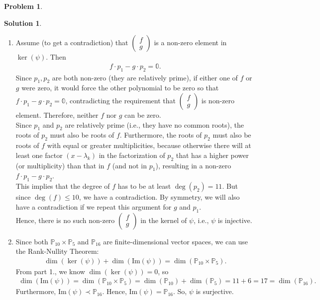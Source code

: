 \documentclass{article}
\theoremstyle{definition}
\newtheorem*{prob*}{Problem}
\newtheorem*{sln*}{Solution}
\newcommand{\ima}{\text{Im}}
\begin{document}
\begin{prob*}
\begin{sln*}
\begin{enumerate}
\begin{enumerate}
		
		
	\end{enumerate}

	
	\item Assume (to get a contradiction) that $\begin{pmatrix}
	f\\g
	\end{pmatrix}$ is a non-zero element in $\ker(\psi)$. Then 
	\begin{align*}
	f\cdot p_1 - g\cdot p_2 = \mathbb{0}.
	\end{align*}
	Since $p_1, p_2$ are both non-zero (they are relatively prime), if either one of $f$ or $g$ were zero, it would force the other polynomial to be zero so that $f\cdot p_1 - g\cdot p_2 = \mathbb{0}$, contradicting the requirement that $\begin{pmatrix}
	f\\g
	\end{pmatrix}$ is non-zero element. Therefore, neither $f$ nor $g$ can be zero. \\
	
	Since $p_1$ and $p_2$ are relatively prime (i.e., they have no common roots), the roots of $p_2$ must also be roots of $f$. Furthermore, the roots of $p_2$ must also be roots of $f$ with equal or greater multiplicities, because otherwise there will at least one factor $(x - \lambda_k)$ in the factorization of $p_2$ that has a higher power (or multiplicity) than that in $f$ (and not in $p_1$), resulting in a non-zero $f\cdot p_1 - g\cdot p_2$.\\
		
	This implies that the degree of $f$ has to be at least $\deg(p_2) = 11$. But since $\deg(f) \leq 10$, we have a contradiction. By symmetry, we will also have a contradiction if we repeat this argument for $g$ and $p_1$.\\
	
	Hence, there is no such non-zero $\begin{pmatrix}
	f\\g
	\end{pmatrix}$ in the kernel of $\psi$, i.e., $\psi$ is injective. \\
	
	
	\item Since both $\mathbb{P}_{10}\times \mathbb{P}_5$ and $\mathbb{P}_{16}$ are finite-dimensional vector spaces, we can use the Rank-Nullity Theorem:
	\begin{align*}
	\dim(\ker(\psi)) + \dim(\ima(\psi)) = \dim(\mathbb{P}_{10} \times \mathbb{P}_{5}).
	\end{align*}
	From part 1., we know $\dim(\ker(\psi)) = 0$, so
	\begin{align*}
	\dim(\ima(\psi)) = \dim(\mathbb{P}_{10} \times \mathbb{P}_{5}) = \dim(\mathbb{P}_{10}) + \dim(\mathbb{P}_5) = 11 + 6 = 17 = \dim(\mathbb{P}_{16}).
	\end{align*}
	Furthermore, $\ima(\psi) \prec \mathbb{P}_{16}$. Hence, $\ima(\psi) = \mathbb{P}_{16}$. So, $\psi$ is surjective. 




\end{enumerate}
\end{sln*}
\end{prob*}
\end{document}
